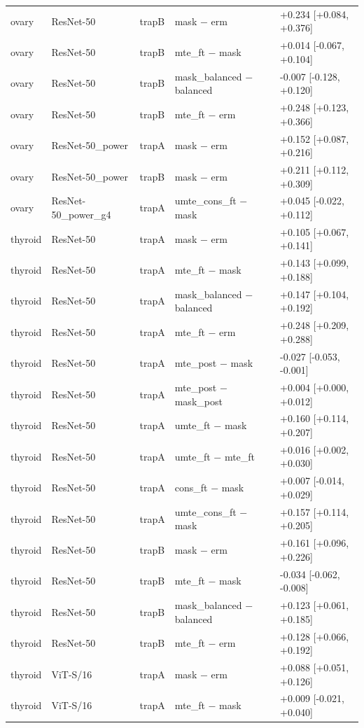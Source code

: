 \begin{table}[H]
\begin{tabular}{lllll}
ovary & ResNet-50 & trapB & mask $-$ erm & +0.234 [+0.084, +0.376] \\
ovary & ResNet-50 & trapB & mte\_ft $-$ mask & +0.014 [-0.067, +0.104] \\
ovary & ResNet-50 & trapB & mask\_balanced $-$ balanced & -0.007 [-0.128, +0.120] \\
ovary & ResNet-50 & trapB & mte\_ft $-$ erm & +0.248 [+0.123, +0.366] \\
ovary & ResNet-50\_power & trapA & mask $-$ erm & +0.152 [+0.087, +0.216] \\
ovary & ResNet-50\_power & trapB & mask $-$ erm & +0.211 [+0.112, +0.309] \\
ovary & ResNet-50\_power\_g4 & trapA & umte\_cons\_ft $-$ mask & +0.045 [-0.022, +0.112] \\
thyroid & ResNet-50 & trapA & mask $-$ erm & +0.105 [+0.067, +0.141] \\
thyroid & ResNet-50 & trapA & mte\_ft $-$ mask & +0.143 [+0.099, +0.188] \\
thyroid & ResNet-50 & trapA & mask\_balanced $-$ balanced & +0.147 [+0.104, +0.192] \\
thyroid & ResNet-50 & trapA & mte\_ft $-$ erm & +0.248 [+0.209, +0.288] \\
thyroid & ResNet-50 & trapA & mte\_post $-$ mask & -0.027 [-0.053, -0.001] \\
thyroid & ResNet-50 & trapA & mte\_post $-$ mask\_post & +0.004 [+0.000, +0.012] \\
thyroid & ResNet-50 & trapA & umte\_ft $-$ mask & +0.160 [+0.114, +0.207] \\
thyroid & ResNet-50 & trapA & umte\_ft $-$ mte\_ft & +0.016 [+0.002, +0.030] \\
thyroid & ResNet-50 & trapA & cons\_ft $-$ mask & +0.007 [-0.014, +0.029] \\
thyroid & ResNet-50 & trapA & umte\_cons\_ft $-$ mask & +0.157 [+0.114, +0.205] \\
thyroid & ResNet-50 & trapB & mask $-$ erm & +0.161 [+0.096, +0.226] \\
thyroid & ResNet-50 & trapB & mte\_ft $-$ mask & -0.034 [-0.062, -0.008] \\
thyroid & ResNet-50 & trapB & mask\_balanced $-$ balanced & +0.123 [+0.061, +0.185] \\
thyroid & ResNet-50 & trapB & mte\_ft $-$ erm & +0.128 [+0.066, +0.192] \\
thyroid & ViT-S/16 & trapA & mask $-$ erm & +0.088 [+0.051, +0.126] \\
thyroid & ViT-S/16 & trapA & mte\_ft $-$ mask & +0.009 [-0.021, +0.040] \\

\end{tabular}
\end{table}
